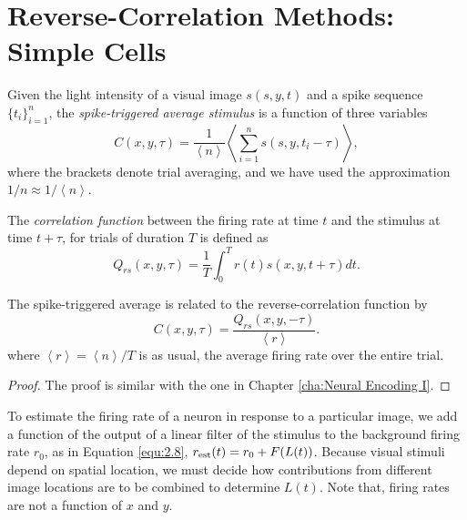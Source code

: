 \section{Reverse-Correlation Methods: Simple Cells}
\label{sec:ReverseCorrelationMethodsForSimpleCells}
\begin{defn}
  \label{def: spikeTriggeredAverage}
  Given the light intensity of a visual image $s(s,y,t)$ and a spike sequence $\{t_i\}_{i = 1}^n$, the \emph{spike-triggered average stimulus}  is a function of three variables
  \begin{equation}
    \label{equ:2.21}
    C(x,y,\tau) = \frac{1}{\left<n\right>}\left<\sum\limits_{i = 1}^ns(s,y,t_i-\tau)\right>,
  \end{equation}
  where the brackets denote trial averaging, and we have used the approximation $1/n \approx 1/\left<n\right>$.
\end{defn}

\begin{defn}
  \label{def:crrelationFuncForVisual}
  The \emph{correlation function} between the firing rate at time $t$ and the stimulus at time $t+\tau$, for trials of duration $T$ is defined as
  \begin{equation}
    \label{equ:2.22}
    Q_{rs}(x,y,\tau) = \frac{1}{T}\int_0^Tr(t)s(x,y,t+\tau)dt.
  \end{equation}
\end{defn}

\begin{prop}
  \label{prop:CQ_relation}
  The spike-triggered average is related to the reverse-correlation function by
  \begin{equation}
    \label{equ:2.23}
    C(x,y,\tau) = \frac{Q_{rs}(x,y,-\tau)}{\left<r\right>}.
  \end{equation}
  where $\left<r\right> = \left<n\right>/T$ is as usual, the average firing rate over the entire trial.
\end{prop}
\begin{proof}
  The proof is similar with the one in Chapter \ref{cha:Neural Encoding I}.
\end{proof}

\begin{rem}
  To estimate the firing rate of a neuron in response to a particular image, we add a function of the output of a linear filter of the stimulus to the background firing rate $r_0$, as in Equation \ref{equ:2.8}, $r_{\rm{est}}(t) = r_0 + F(L(t))$. Because visual stimuli depend on spatial location, we must decide how contributions from different image locations are to be combined to determine $L(t)$. Note that, firing rates are not a function of $x$ and $y$.
\end{rem}

